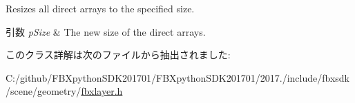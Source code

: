 Resizes all direct arrays to the specified size. 
\begin{DoxyParams}{引数}
{\em p\+Size} & The new size of the direct arrays. \\
\hline
\end{DoxyParams}


このクラス詳解は次のファイルから抽出されました\+:\begin{DoxyCompactItemize}
\item 
C\+:/github/\+F\+B\+Xpython\+S\+D\+K201701/\+F\+B\+Xpython\+S\+D\+K201701/2017./include/fbxsdk/scene/geometry/\hyperlink{fbxlayer_8h}{fbxlayer.\+h}\end{DoxyCompactItemize}
